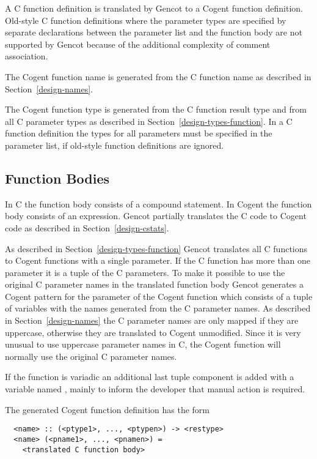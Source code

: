 
A C function definition is translated by Gencot to a Cogent function definition. Old-style C function definitions
where the parameter types are specified by separate declarations between the parameter list and the function body
are not supported by Gencot because of the additional complexity of comment association.

The Cogent function name is generated from the C function name as described in Section~\ref{design-names}.

The Cogent function type is generated from the C function result type and from all C parameter types as described
in Section~\ref{design-types-function}. In a C
function definition the types for all parameters must be specified in the parameter list, if old-style function
definitions are ignored.

\subsection{Function Bodies}
\label{design-fundefs-body}

In C the function body consists of a compound statement. In Cogent
the function body consists of an expression. Gencot partially translates the C code to Cogent code as described 
in Section~\ref{design-cstats}.

As described in Section~\ref{design-types-function} Gencot translates all C functions to Cogent functions with
a single parameter. If the C function has more than one parameter it is a tuple of the C parameters. To make it
possible to use the original C parameter names in the translated function body
Gencot generates a Cogent pattern for the parameter of the Cogent function which 
consists of a tuple of variables with the names generated from the C parameter names. As described in 
Section~\ref{design-names} the C parameter names are only mapped if they are uppercase, otherwise they are
translated to Cogent unmodified. Since it is very unusual
to use uppercase parameter names in C, the Cogent function will normally use the original C parameter names.

If the function is variadic an additional last tuple component is added with a variable named
, mainly to inform the developer that manual action is required.

The generated Cogent function definition has the form
\begin{verbatim}
  <name> :: (<ptype1>, ..., <ptypen>) -> <restype>
  <name> (<pname1>, ..., <pnamen>) = 
    <translated C function body>
\end{verbatim}

